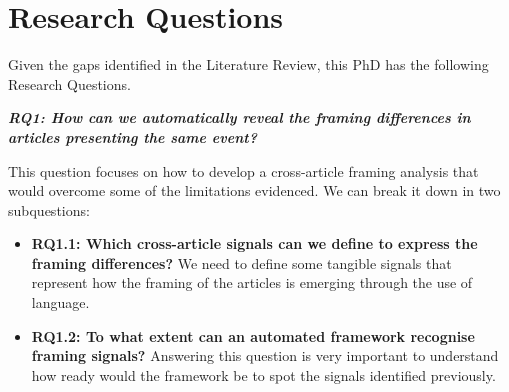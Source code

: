 \chapter{Research Questions}
\label{chap:research_questions}


Given the gaps identified in the Literature Review, this PhD has the following Research Questions.

\vspace{12px}

\textit{\textbf{RQ1: How can we automatically reveal the framing differences in articles presenting the same event?}}

\vspace{12px}

This question focuses on how to develop a cross-article framing analysis that would overcome some of the limitations evidenced.
We can break it down in two subquestions:

\begin{itemize}
    
    \item \textbf{RQ1.1: Which cross-article signals can we define to express the framing differences?} We need to define some tangible signals that represent how the framing of the articles is emerging through the use of language. %
    
    
    \item \textbf{RQ1.2: To what extent can an automated framework recognise framing signals?}
    Answering this question is very important to understand how ready would the framework be to spot the signals identified previously. %
    
\end{itemize}


